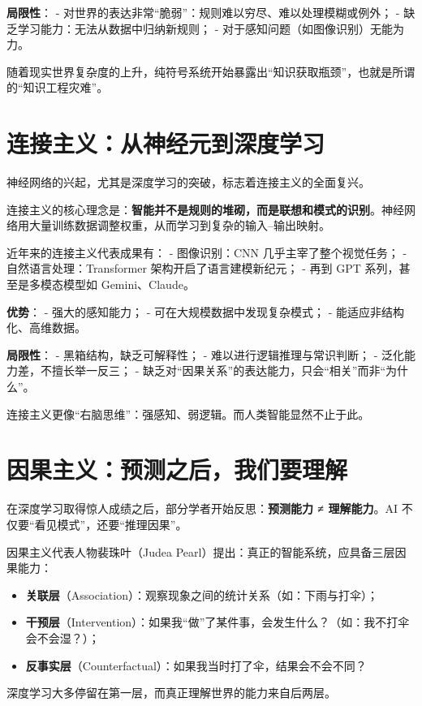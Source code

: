 \textbf{局限性}：
- 对世界的表达非常“脆弱”：规则难以穷尽、难以处理模糊或例外；
- 缺乏学习能力：无法从数据中归纳新规则；
- 对于感知问题（如图像识别）无能为力。

随着现实世界复杂度的上升，纯符号系统开始暴露出“知识获取瓶颈”，也就是所谓的“知识工程灾难”。

\section*{连接主义：从神经元到深度学习}

神经网络的兴起，尤其是深度学习的突破，标志着连接主义的全面复兴。

连接主义的核心理念是：\textbf{智能并不是规则的堆砌，而是联想和模式的识别}。神经网络用大量训练数据调整权重，从而学习到复杂的输入–输出映射。

近年来的连接主义代表成果有：
- 图像识别：CNN 几乎主宰了整个视觉任务；
- 自然语言处理：Transformer 架构开启了语言建模新纪元；
- 再到 GPT 系列，甚至是多模态模型如 Gemini、Claude。

\textbf{优势}：
- 强大的感知能力；
- 可在大规模数据中发现复杂模式；
- 能适应非结构化、高维数据。

\textbf{局限性}：
- 黑箱结构，缺乏可解释性；
- 难以进行逻辑推理与常识判断；
- 泛化能力差，不擅长举一反三；
- 缺乏对“因果关系”的表达能力，只会“相关”而非“为什么”。

连接主义更像“右脑思维”：强感知、弱逻辑。而人类智能显然不止于此。

\section*{因果主义：预测之后，我们要理解}

在深度学习取得惊人成绩之后，部分学者开始反思：\textbf{预测能力 ≠ 理解能力}。AI 不仅要“看见模式”，还要“推理因果”。

因果主义代表人物裴珠叶（Judea Pearl）提出：真正的智能系统，应具备三层因果能力：

\begin{itemize}
\item \textbf{关联层}（Association）：观察现象之间的统计关系（如：下雨与打伞）；
\item \textbf{干预层}（Intervention）：如果我“做”了某件事，会发生什么？（如：我不打伞会不会湿？）；
\item \textbf{反事实层}（Counterfactual）：如果我当时打了伞，结果会不会不同？
\end{itemize}

深度学习大多停留在第一层，而真正理解世界的能力来自后两层。

